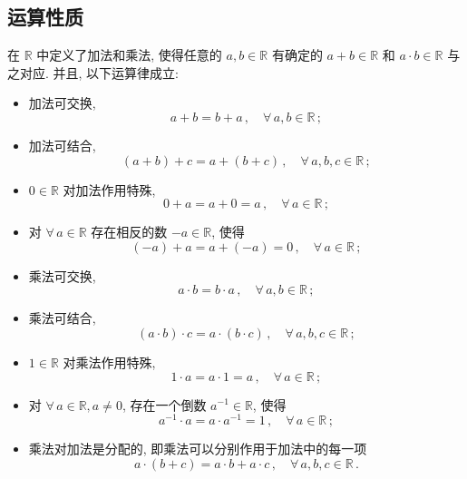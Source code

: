 \documentclass{book}
\newcommand{\Any}{\forall\,}
\newcommand{\R}{\mathbb{R}}
\numberwithin{equation}{section}
\numberwithin{figure}{section}
\theoremstyle{definition}
\begin{document}
\subsection{运算性质}
在 $\mathbb{R}$ 中定义了加法和乘法, 使得任意的 $a,b\in \mathbb{R}$ 有确定的 $a+b\in \mathbb{R}$ 和 $a\cdot b\in\R$ 与之对应. 并且, 以下运算律成立:
\begin{itemize}
  \item 加法可交换,
    \begin{equation*}
      a+b=b+a\,,\quad\Any a,b\in\R\,;\tag{$F_1$}
    \end{equation*}
  \item 加法可结合,
    \begin{equation*}
      (a+b)+c=a+(b+c)\,,\quad\Any a,b,c\in\R\,;\tag{$F_2$}
    \end{equation*}
  \item $0\in\R$ 对加法作用特殊,
    \begin{equation*}
      0+a=a+0=a\,,\quad\Any a\in\R\,;\tag{$F_3$}
    \end{equation*}
  \item 对 $\Any a\in\R$ 存在相反的数 $-a\in\R$, 使得
    \begin{equation*}
      (-a)+a=a+(-a)=0\,,\quad\Any a\in\R\,;\tag{$F_4$}
    \end{equation*}
  \item 乘法可交换,
    \begin{equation*}
      a\cdot b=b\cdot a\,,\quad\Any a,b\in\R\,;\tag{$F_5$}
    \end{equation*}
  \item 乘法可结合,
    \begin{equation*}
      (a\cdot b)\cdot c=a\cdot(b\cdot c)\,,\quad\Any a,b,c\in\R\,;\tag{$F_6$}
    \end{equation*}
  \item $1\in\R$ 对乘法作用特殊,
    \begin{equation*}
      1\cdot a=a\cdot 1=a\,,\quad\Any a\in\R\,;\tag{$F_7$}
    \end{equation*}
  \item 对 $\Any a\in\R,a\neq 0$, 存在一个倒数 $a^{-1}\in\R$, 使得
    \begin{equation*}
      a^{-1}\cdot a=a\cdot a^{-1}=1\,,\quad\Any a\in\R\,;\tag{$F_8$}
    \end{equation*}
  \item 乘法对加法是分配的, 即乘法可以分别作用于加法中的每一项
    \begin{equation*}
      a\cdot(b+c)=a\cdot b+a\cdot c\,,\quad\Any a,b,c\in\R\,.\tag{$F_9$}
    \end{equation*}
\end{itemize}
\end{document}
